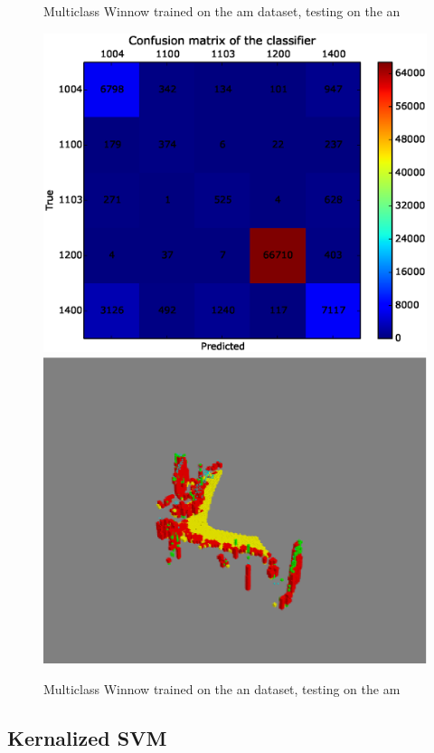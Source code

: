 \documentclass[10pt,a4paper]{article}
\begin{document}
\begin{figure}[htp]
\caption{Multiclass Winnow trained on the am dataset, testing on the an}
\vspace{0.1 in}
\includegraphics[scale=0.4,trim = 0.3 0.3 0.3 0.3,clip]{figs/winnow_antoam_test1.eps}
\includegraphics[scale=0.4]{figs/winnow_antoam_test1_plot.eps}
\caption{Multiclass Winnow trained on the an dataset, testing on the am}
\label{}
\end{figure}


\subsection{Kernalized SVM}
\end{document}
